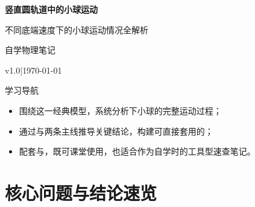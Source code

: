 \documentclass[a4paper,11pt]{ctexart}
\renewcommand{\notetitle}{竖直圆轨道中的小球运动}
\renewcommand{\noteauthor}{自学物理笔记}
\renewcommand{\notedate}{\today}
\renewcommand{\notesubtitle}{不同底端速度下的小球运动情况全解析}
\renewcommand{\noteversion}{v1.0}
\begin{document}
\thispagestyle{empty}
\setcounter{page}{1}

\noindent
\begin{minipage}[t][0.7\textheight][c]{\textwidth}
  \raggedleft
  \vspace*{\fill}
  {\sffamily\bfseries\Huge\color{accent}\notetitle\par}
  \vspace{0.6em}
  {\Large\color{inkgray}\notesubtitle\par}
  \vspace{0.5em}
  {\large\color{inkgray}\noteauthor\par}
  \vspace{0.4em}
  {\normalsize\color{inkgray}\noteversion\quad|\quad\notedate\par}
  \vspace*{\fill}
\end{minipage}

\begin{center}
\begin{minipage}{0.84\textwidth}
  \textcolor{inkgray}{\sffamily\small 学习导航}\\
  \begin{itemize}
    \item 围绕这一经典模型，系统分析下小球的完整运动过程；
    \item 通过与两条主线推导关键结论，构建可直接套用的；
    \item 配套与，既可课堂使用，也适合作为自学时的工具型速查笔记。
  \end{itemize}
\end{minipage}
\end{center}
\vspace{1em}

\clearpage
\thispagestyle{plain}
\tableofcontents

\clearpage
\section{核心问题与结论速览}
\end{document}
